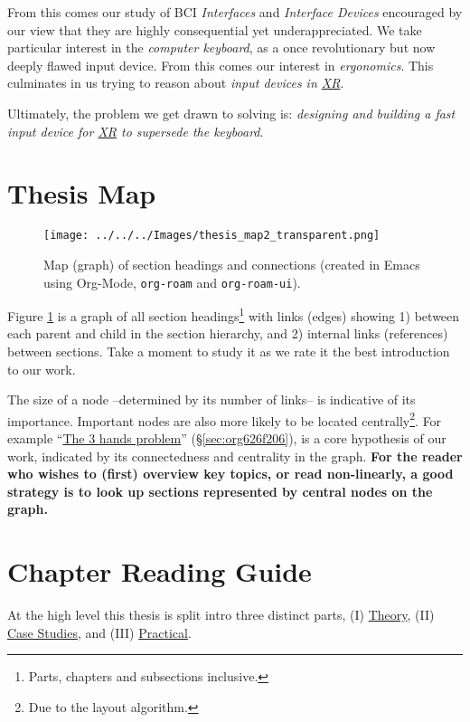 \documentclass[logo,bsc,singlespacing,parskip]{infthesis}
\begin{document}
From this comes our study of BCI \emph{Interfaces} and \emph{Interface Devices} encouraged by our view that they are highly consequential yet underappreciated.
We take particular interest in the \emph{computer keyboard}, as a once revolutionary but now deeply flawed input device.
From this comes our interest in \emph{ergonomics}.
This culminates in us trying to reason about \emph{input devices in \hyperref[org1d567af]{XR}}.

Ultimately, the problem we get drawn to solving is: \emph{designing and building a fast input device for \hyperref[org1d567af]{XR} to supersede the keyboard}.
\chapter*{Thesis Map}
\label{sec:orgf9e0021}

\begin{figure}[H]
\centering
\texttt{[image: ../../../Images/thesis\_map2\_transparent.png]}
\caption[Thesis map]{\label{fig:topic_map}Map (graph) of section headings and connections (created in Emacs using Org-Mode, \texttt{org-roam} and \texttt{org-roam-ui}).}
\end{figure}

Figure \ref{fig:topic_map} is a graph of all section headings\footnote{Parts, chapters and subsections inclusive.} with links (edges) showing 1) between each parent and child in the section hierarchy, and 2) internal links (references) between sections.
Take a moment to study it as we rate it the best introduction to our work.

The size of a node --determined by its number of links-- is indicative of its importance.
Important nodes are also more likely to be located centrally\footnote{Due to the layout algorithm.}.
For example ``\hyperref[sec:org626f206]{The 3 hands problem}'' (\S \ref{sec:org626f206}), is a core hypothesis of our work, indicated by its connectedness and centrality in the graph.
\textbf{For the reader who wishes to (first) overview key topics, or read non-linearly, a good strategy is to look up sections represented by central nodes on the graph.}

\chapter*{Chapter Reading Guide}
\label{sec:org03873bb}
At the high level this thesis is split intro three distinct parts, (I) \hyperref[sec:orgb334d99]{Theory}, (II) \hyperref[sec:org0d3df1f]{Case Studies}, and (III) \hyperref[sec:org462bb32]{Practical}.
\end{document}
